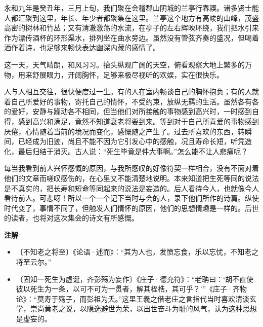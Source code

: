 \documentclass[12pt,UTF-8,openany,a4]{ctexbook}
\begin{document}
\begin{large}
    \yiwen 
    永和九年是癸丑年，三月上旬，我们聚在会稽郡山阴城的兰亭行春禊。诸多贤士能人都汇聚到这里，年长、年少者都聚集在这里。兰亭这个地方有高峻的山峰，茂盛高密的树林和竹丛；又有清澈激荡的水流，在亭子的左右辉映环绕，我们把水引来作为漂传酒杯的环形渠水，排列坐在曲水旁边。虽然没有管弦齐奏的盛况，但喝着酒作着诗，也足够来畅快表达幽深内藏的感情了。
    
    这一天，天气晴朗，和风习习。抬头纵观广阔的天空，俯看观察大地上繁多的万物，用来舒展眼力，开阔胸怀，足够来极尽视听的欢娱，实在很快乐。
    
    人与人相互交往，很快便度过一生。有的人在室内畅谈自己的胸怀抱负；有的人就着自己所爱好的事物，寄托自己的情怀，不受约束，放纵无羁的生活。虽然各有各的爱好，安静与躁动各不相同，但当他们对所接触的事物感到高兴时，一时感到自得，感到高兴和满足，竟然不知道衰老将要到来。等到对于自己所喜爱的事物感到厌倦，心情随着当前的境况而变化，感慨随之产生了。过去所喜欢的东西，转瞬间，已经成为旧迹，尚且不能不因为它引发心中的感触，况且寿命长短，听凭造化，最后归结于消灭。古人说：“死生毕竟是件大事啊。”怎么能不让人悲痛呢？
    
    每当我看到前人兴怀感慨的原因，与我所感叹的好像符契一样相合，没有不面对着他们的文章而嗟叹感伤的，在心里又不能清楚地说明。本来知道把生死等同的说法是不真实的，把长寿和短命等同起来的说法是妄造的。后人看待今人，也就像今人看待前人。可悲呀！所以一个一个记下当时与会的人，录下他们所作的诗篇。纵使时代变了，事情不同了，但触发人们情怀的原因，他们的思想情趣是一样的。后世的读者，也将对这次集会的诗文有所感慨。
    
\end{large}


\newpage

\begin{Large}
    \noindent\textbf{注解}
\end{Large}


\vspace{-1em}

\begin{itemize}
    \setlength\itemsep{-0.2em}
    \item〔不知老之将至〕{\yiwen 《论语·述而》：“其为人也，发愤忘食，乐以忘忧，不知老之将至云尔。”}
    \item〔固知一死生为虚诞，齐彭殇为妄作〕{\yiwen 《庄子·德充符》：“老聃曰：‘胡不直使彼以死生为一条，以可不可为一贯者，解其桎梏，其可乎？’”《庄子·齐物论》：“莫寿于殇子，而彭祖为夭。”这里王羲之借老庄之言指代当时喜欢清谈玄学，崇尚黄老之说，以隐逸避世为荣，以出世奋斗为耻的风气，认为这种思想是虚妄的。}
\end{itemize}
\end{document}
